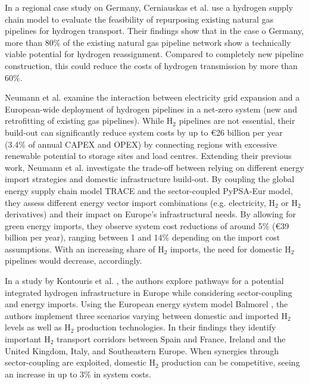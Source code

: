 \documentclass[pdflatex,sn-nature]{sn-jnl}%
\theoremstyle{thmstyleone}%
\theoremstyle{thmstyletwo}%
\theoremstyle{thmstylethree}%
\begin{document}
In a regional case study on Germany, Cerniauskas et al. \cite{cerniauskasOptionsNaturalGas2020} use a hydrogen supply chain model \cite{reussSeasonalStorageAlternative2017} to evaluate the feasibility of repurposing existing natural gas pipelines for hydrogen transport. Their findings show that in the case o Germany, more than 80\% of the existing natural gas pipeline network show a technically viable potential for hydrogen reassignment. Compared to completely new pipeline construction, this could reduce the costs of hydrogen transmission by more than 60\%.

Neumann et al. \cite{neumannPotentialRoleHydrogen2023} examine the interaction between electricity grid expansion and a European-wide deployment of hydrogen pipelines in a net-zero system (new and retrofitting of existing gas pipelines). While H$_2$ pipelines are not essential, their build-out can significantly reduce system costs by up to €26 billion per year (3.4\% of annual CAPEX and OPEX) by connecting regions with excessive renewable potential to storage sites and load centres. 
Extending their previous work, Neumann et al. \cite{neumannEnergyImportsInfrastructure2024} investigate the trade-off between relying on different energy import strategies and domestic infrastructure build-out. By coupling the global energy supply chain model TRACE \cite{hamppImportOptionsChemical2023} and the sector-coupled PyPSA-Eur model, they assess different energy vector import combinations (e.g. electricity, H$_2$ or H$_2$ derivatives) and their impact on Europe's infrastructural needs. 
By allowing for green energy imports, they observe system cost reductions of around 5\% (€39 billion per year), ranging between 1 and 14\% depending on the import cost assumptions. With an increasing share of H$_2$ imports, the need for domestic H$_2$ pipelines would decrease, accordingly.

In a study by Kontouris et al. \cite{kountourisUnifiedEuropeanHydrogen2024}, the authors explore pathways for a potential integrated hydrogen infrastructure in Europe while considering sector-coupling and energy imports. Using the European energy system model Balmorel \cite{wieseBalmorelOpenSource2018}, the authors implement three scenarios varying between domestic and imported H$_2$ levels as well as H$_2$ production technologies. In their findings they identify important H$_2$ transport corridors between Spain and France, Ireland and the United Kingdom, Italy, and Southeastern Europe. When synergies through sector-coupling are exploited, domestic H$_2$ production can be competitive, seeing an increase in up to 3\% in system costs.
\end{document}
